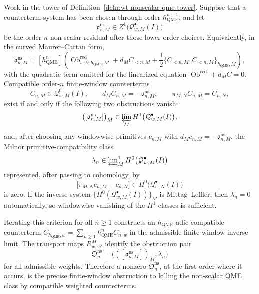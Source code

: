 \begin{thm}
\label{thm:wt-nonscalar-counterterm-criterion}
  Work in the tower of
  Definition~\ref{defn:wt-nonscalar-qme-tower}.  Suppose that a
  counterterm system has been chosen through order \(\hbar_{\mathrm{QME}}^{n-1}\), and
  let
  \[
    \mathfrak o^{\mathrm{ns}}_{n,M}
      \in Z^1\bigl(\mathcal Q^\bullet_{w,M}(I)\bigr)
  \]
  be the order-\(n\) non-scalar residual after those lower-order choices.
  Equivalently, in the curved Maurer--Cartan form,
  \[
    \mathfrak o^{\mathrm{ns}}_{n,M}
      =
      [\hbar_{\mathrm{QME}}^n]\left(
        \operatorname{Ob}^{\mathrm{red}}_{w,\partial,\hbar_{\mathrm{QME}},M}
        +d_MC_{<n,M}
        +\frac12\{C_{<n,M},C_{<n,M}\}_{\hbar_{\mathrm{QME}},M}
      \right),
  \]
  with the quadratic term omitted for the linearized equation
  \(\operatorname{Ob}^{\mathrm{red}}+d_MC=0\).  Compatible
  order-\(n\) finite-window counterterms
  \[
    C_{n,M}\in\mathcal Q^0_{w,M}(I),\qquad
    d_MC_{n,M}=-\mathfrak o^{\mathrm{ns}}_{n,M},\qquad
    \pi_{M,N}C_{n,M}=C_{n,N},
  \]
  exist if and only if the following two obstructions vanish:
  \[
    \bigl([\mathfrak o^{\mathrm{ns}}_{n,M}]\bigr)_M
      \in
      \varprojlim_M H^1\bigl(\mathcal Q^\bullet_{w,M}(I)\bigr),
  \]
  and, after choosing any windowwise primitives
  \(c_{n,M}\) with \(d_Mc_{n,M}=-\mathfrak o^{\mathrm{ns}}_{n,M}\), the
  Milnor primitive-compatibility class
  \[
    \lambda_n\in
      \varprojlim\nolimits^1_M
      H^0\bigl(\mathcal Q^\bullet_{w,M}(I)\bigr)
  \]
  represented, after passing to cohomology, by
  \[
    \bigl[\pi_{M,N}c_{n,M}-c_{n,N}\bigr]\in
      H^0\bigl(\mathcal Q^\bullet_{w,N}(I)\bigr)
  \]
  is zero.  If the inverse system
  \(\{H^0(\mathcal Q^\bullet_{w,M}(I))\}_M\) is Mittag--Leffler, then
  \(\lambda_n=0\) automatically, so windowwise vanishing of the
  \(H^1\)-classes is sufficient.

  Iterating this criterion for all \(n\geq1\) constructs an
  \(\hbar_{\mathrm{QME}}\)-adic compatible counterterm
  \(C_{\hbar_{\mathrm{QME}},w}=\sum_{n\geq1}\hbar_{\mathrm{QME}}^n C_{n,w}\) in the admissible
  finite-window inverse limit.  The transport maps \(R^M_{w,w'}\)
  identify the obstruction pair
  \[
    \mathfrak O^{\mathrm{ns}}_n
      =
      \bigl(([\mathfrak o^{\mathrm{ns}}_{n,M}])_M,\lambda_n\bigr)
  \]
  for all admissible weights.  Therefore a nonzero
  \(\mathfrak O^{\mathrm{ns}}_n\), at the first order where it occurs, is
  the precise finite-window obstruction to killing the non-scalar QME
  class by compatible weighted counterterms.
\end{thm}

